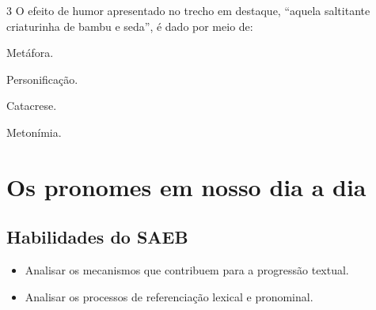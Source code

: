 \num{3} O efeito de humor apresentado no trecho em destaque, ``aquela saltitante
criaturinha de bambu e seda'', é dado por meio de:

\begin{multicols}{2}
\begin{escolha}
\item Metáfora.
\item Personificação.
\item Catacrese.
\item Metonímia.
\end{escolha}
\end{multicols}




\chapter{Os pronomes em nosso dia a dia}

\section*{Habilidades do SAEB }
\begin{itemize}
\item Analisar os mecanismos que contribuem para a
progressão textual. 
\item Analisar os processos de referenciação lexical e
pronominal.
\end{itemize}

